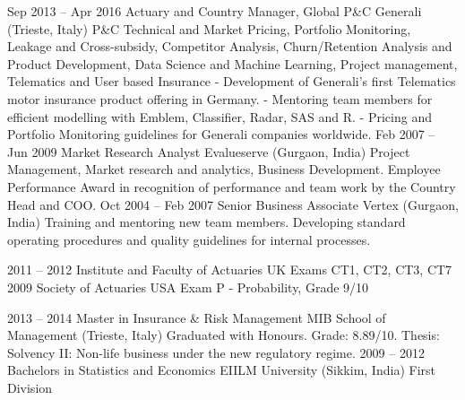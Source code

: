 \documentclass[
	a4paper,
]{fortysecondscv}
\begin{document}
\begin{cvtable}[3]
{\begin{itemize}[nosep, leftmargin=0pt]
				\end{itemize}
			}
		\cvitem
			{Sep 2013 -- Apr 2016}
			{Actuary and Country Manager, Global P\&C}
			{Generali (Trieste, Italy)}
			{P\&C Technical and Market Pricing, Portfolio Monitoring, Leakage and Cross-subsidy, Competitor Analysis, Churn/Retention Analysis and Product Development, Data Science and Machine Learning, Project management, Telematics and User based Insurance
				- Development of Generali’s first Telematics motor insurance product offering in Germany.
				- Mentoring team members for efficient modelling with Emblem, Classifier, Radar, SAS and R.
				- Pricing and Portfolio Monitoring guidelines for Generali companies worldwide.}
		\cvitem
			{Feb 2007 -- Jun 2009}
			{Market Research Analyst}
			{Evalueserve (Gurgaon, India)}
			{
				Project Management, Market research and analytics, Business Development.
				Employee Performance Award in recognition of performance and team work by the Country Head and COO.
			}
		\cvitem
			{Oct 2004 -- Feb 2007}
			{Senior Business Associate}
			{Vertex (Gurgaon, India)}
			{
				Training and mentoring new team members. 
				Developing standard operating procedures and quality guidelines for internal processes.
			}
	\end{cvtable}


		\begin{cvtable}[1.5]
			\cvitem
				{2011 -- 2012}
				{Institute and Faculty of Actuaries}
				{UK}
				{Exams CT1, CT2, CT3, CT7}
			\cvitem
				{2009}
				{Society of Actuaries}
				{USA}
				{Exam P - Probability, Grade 9/10}
		\end{cvtable}

	\cvsubsection{Formal}
		\begin{cvtable}[1.5]
			\cvitem
				{2013 -- 2014}
				{Master in Insurance \& Risk Management}
				{MIB School of Management (Trieste, Italy)}
				{
					Graduated with Honours. Grade: 8.89/10.
					Thesis: Solvency II: Non-life business under the new regulatory regime.
				}
			\cvitem
				{2009 -- 2012}
				{Bachelors in Statistics and Economics}
				{EIILM University (Sikkim, India)}
				{First Division}
		\end{cvtable}
\end{document}
